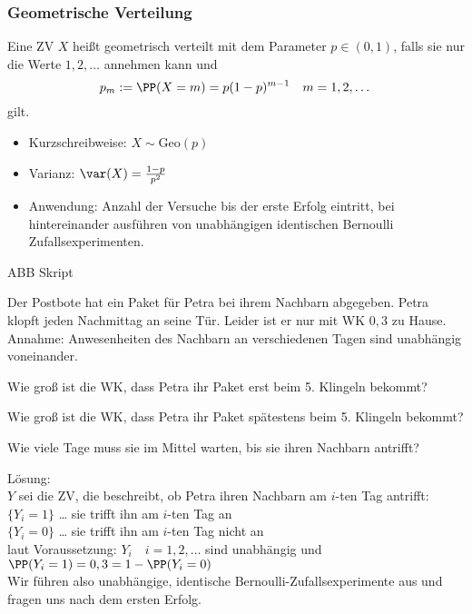 \subsubsection{Geometrische Verteilung}
 Eine ZV $X$ heißt geometrisch verteilt mit dem Parameter $p\in (0,1)$, falls sie nur die Werte $1,2,\dots$ annehmen kann und 
$$p_m:=\PP(X=m)=p(1-p)^{m-1} \quad m=1,2,\dots$$
gilt.
\begin{itemize}
\item Kurzschreibweise: $X\sim \mathrm{Geo}(p)$
\item Varianz: $\var(X)=\frac{1-p}{p^2}$
\item Anwendung: Anzahl der Versuche bis der erste Erfolg eintritt, bei hintereinander ausführen von unabhängigen identischen Bernoulli Zufallsexperimenten.
\end{itemize}
ABB Skript

 Der Postbote hat ein Paket für Petra bei ihrem Nachbarn abgegeben. Petra klopft jeden Nachmittag an seine Tür. Leider ist er nur mit WK $0,3$ zu Hause. Annahme: Anwesenheiten des Nachbarn an verschiedenen Tagen sind unabhängig voneinander. 
\begin{anumerate}
\item Wie groß ist die WK, dass Petra ihr Paket erst beim 5. Klingeln bekommt?
\item Wie groß ist die WK, dass Petra ihr Paket spätestens beim 5. Klingeln bekommt?
\item Wie viele Tage muss sie im Mittel warten, bis sie ihren Nachbarn antrifft?
\end{anumerate} 
Lösung:\\
$Y$ sei die ZV, die beschreibt, ob Petra ihren Nachbarn am $i$-ten Tag antrifft:\\
$\{Y_i=1\}$ … sie trifft ihn am $i$-ten Tag an\\
$\{Y_i=0\}$ … sie trifft ihn am $i$-ten Tag nicht an\\
laut Voraussetzung: $Y_i \quad i=1,2, \dots$ sind unabhängig und $\PP(Y_i=1) = 0,3 = 1-\PP(Y_i=0)$\\
Wir führen also unabhängige, identische Bernoulli-Zufallsexperimente aus und fragen uns nach dem ersten Erfolg.

